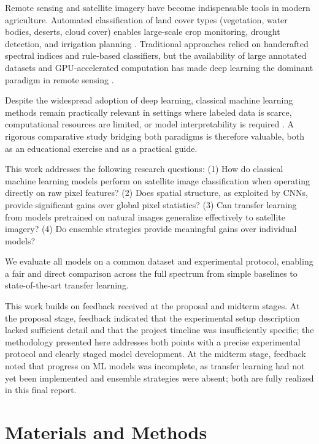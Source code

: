 \documentclass[12pt, a4paper]{article}
\begin{document}
Remote sensing and satellite imagery have become indispensable tools in modern agriculture. Automated classification of land cover types (vegetation, water bodies, deserts, cloud cover) enables large-scale crop monitoring, drought detection, and irrigation planning \cite{rs_agriculture_review}. Traditional approaches relied on handcrafted spectral indices and rule-based classifiers, but the availability of large annotated datasets and GPU-accelerated computation has made deep learning the dominant paradigm in remote sensing \cite{deep_learning_rs}.

Despite the widespread adoption of deep learning, classical machine learning methods remain practically relevant in settings where labeled data is scarce, computational resources are limited, or model interpretability is required \cite{classical_vs_dl}. A rigorous comparative study bridging both paradigms is therefore valuable, both as an educational exercise and as a practical guide.

This work addresses the following research questions: (1) How do classical machine learning models perform on satellite image classification when operating directly on raw pixel features? (2) Does spatial structure, as exploited by CNNs, provide significant gains over global pixel statistics? (3) Can transfer learning from models pretrained on natural images generalize effectively to satellite imagery? (4) Do ensemble strategies provide meaningful gains over individual models?

We evaluate all models on a common dataset and experimental protocol, enabling a fair and direct comparison across the full spectrum from simple baselines to state-of-the-art transfer learning.

This work builds on feedback received at the proposal and midterm stages. At the proposal stage, feedback indicated that the experimental setup description lacked sufficient detail and that the project timeline was insufficiently specific; the methodology presented here addresses both points with a precise experimental protocol and clearly staged model development. At the midterm stage, feedback noted that progress on ML models was incomplete, as transfer learning had not yet been implemented and ensemble strategies were absent; both are fully realized in this final report.

\section{Materials and Methods}
\end{document}
